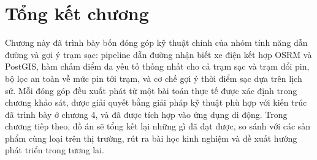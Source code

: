 \documentclass[../Main.tex]{subfiles}
\begin{document}
\section*{Tổng kết chương}

Chương này đã trình bày bốn đóng góp kỹ thuật chính của nhóm tính năng dẫn đường và gợi ý trạm sạc: pipeline dẫn đường nhận biết xe điện kết hợp OSRM và PostGIS, hàm chấm điểm đa yếu tố thống nhất cho cả trạm sạc và trạm đổi pin, bộ lọc an toàn về mức pin tới trạm, và cơ chế gợi ý thời điểm sạc dựa trên lịch sử. Mỗi đóng góp đều xuất phát từ một bài toán thực tế được xác định trong chương khảo sát, được giải quyết bằng giải pháp kỹ thuật phù hợp với kiến trúc đã trình bày ở chương 4, và đã được tích hợp vào ứng dụng di động. Trong chương tiếp theo, đồ án sẽ tổng kết lại những gì đã đạt được, so sánh với các sản phẩm cùng loại trên thị trường, rút ra bài học kinh nghiệm và đề xuất hướng phát triển trong tương lai.
\end{document}
